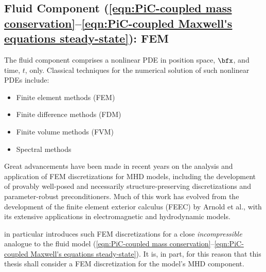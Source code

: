 \subsection*{Fluid Component (\ref{eqn:PiC-coupled mass conservation}--\ref{eqn:PiC-coupled Maxwell's equations steady-state}): FEM}
    The fluid component comprises a nonlinear PDE in position space, $\bfx$, and time, $t$, only. Classical techniques for the numerical solution of such nonlinear PDEs include:
    \begin{itemize}
        \item  Finite element methods (FEM)
        \item  Finite difference methods (FDM)
        \item  Finite volume methods (FVM)
        \item  Spectral methods
    \end{itemize}
    Great advancements have been made in recent years on the analysis and application of FEM discretizations for MHD models, including the development of provably well-posed and necessarily structure-preserving discretizations and parameter-robust preconditioners. \cite{Hu_Xu_2015, Hu_Ma_Yu_2017, Hu_Lee_Xu_2021, Green_et_al_2022, LFM22, Laakmann_Hu_Farrell_2022} Much of this work has evolved from the development of the finite element exterior calculus (FEEC) by Arnold et al., with its extensive applications in electromagnetic and hydrodynamic models. \cite{Arnold_Falk_Winther_2006, Arnold_Falk_Winther_2009, Arnold_2018}
    
    \cite{Laakmann_Hu_Farrell_2022} in particular introduces such FEM discretizations for a close \emph{incompressible} analogue to the fluid model (\ref{eqn:PiC-coupled mass conservation}--\ref{eqn:PiC-coupled Maxwell's equations steady-state}). It is, in part, for this reason that this thesis shall consider a FEM discretization for the model's MHD component.
    